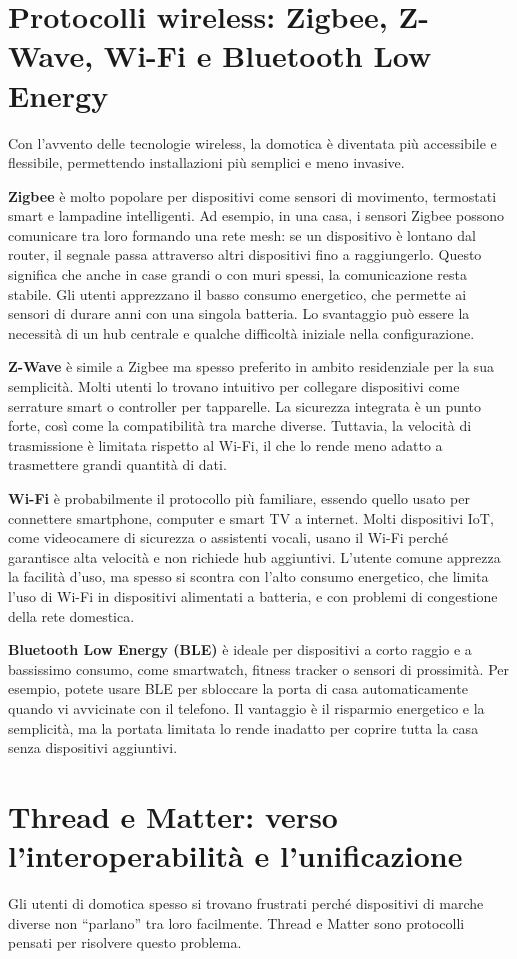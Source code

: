 \section{Protocolli wireless: Zigbee, Z-Wave, Wi-Fi e Bluetooth Low Energy}
Con l’avvento delle tecnologie wireless, la domotica è diventata più accessibile e flessibile, permettendo installazioni più semplici e meno invasive.

\textbf{Zigbee} è molto popolare per dispositivi come sensori di movimento, termostati smart e lampadine intelligenti. Ad esempio, in una casa, i sensori Zigbee possono comunicare tra loro formando una rete mesh: se un dispositivo è lontano dal router, il segnale passa attraverso altri dispositivi fino a raggiungerlo. Questo significa che anche in case grandi o con muri spessi, la comunicazione resta stabile. Gli utenti apprezzano il basso consumo energetico, che permette ai sensori di durare anni con una singola batteria. Lo svantaggio può essere la necessità di un hub centrale e qualche difficoltà iniziale nella configurazione.

\textbf{Z-Wave} è simile a Zigbee ma spesso preferito in ambito residenziale per la sua semplicità. Molti utenti lo trovano intuitivo per collegare dispositivi come serrature smart o controller per tapparelle. La sicurezza integrata è un punto forte, così come la compatibilità tra marche diverse. Tuttavia, la velocità di trasmissione è limitata rispetto al Wi-Fi, il che lo rende meno adatto a trasmettere grandi quantità di dati.

\textbf{Wi-Fi} è probabilmente il protocollo più familiare, essendo quello usato per connettere smartphone, computer e smart TV a internet. Molti dispositivi IoT, come videocamere di sicurezza o assistenti vocali, usano il Wi-Fi perché garantisce alta velocità e non richiede hub aggiuntivi. L’utente comune apprezza la facilità d’uso, ma spesso si scontra con l’alto consumo energetico, che limita l’uso di Wi-Fi in dispositivi alimentati a batteria, e con problemi di congestione della rete domestica.

\textbf{Bluetooth Low Energy (BLE)} è ideale per dispositivi a corto raggio e a bassissimo consumo, come smartwatch, fitness tracker o sensori di prossimità. Per esempio, potete usare BLE per sbloccare la porta di casa automaticamente quando vi avvicinate con il telefono. Il vantaggio è il risparmio energetico e la semplicità, ma la portata limitata lo rende inadatto per coprire tutta la casa senza dispositivi aggiuntivi.

\section{Thread e Matter: verso l'interoperabilità e l'unificazione}
Gli utenti di domotica spesso si trovano frustrati perché dispositivi di marche diverse non “parlano” tra loro facilmente. Thread e Matter sono protocolli pensati per risolvere questo problema.

